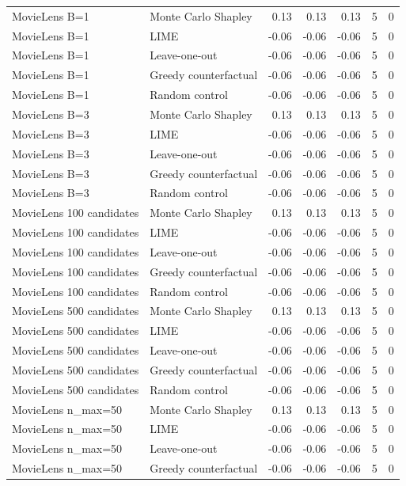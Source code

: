 \begin{table}[t]
{\begin{tabular}{llrrrrr}
MovieLens B=1 & Monte Carlo Shapley & 0.13 & 0.13 & 0.13 & 5 & 0 \\
MovieLens B=1 & LIME & -0.06 & -0.06 & -0.06 & 5 & 0 \\
MovieLens B=1 & Leave-one-out & -0.06 & -0.06 & -0.06 & 5 & 0 \\
MovieLens B=1 & Greedy counterfactual & -0.06 & -0.06 & -0.06 & 5 & 0 \\
MovieLens B=1 & Random control & -0.06 & -0.06 & -0.06 & 5 & 0 \\
MovieLens B=3 & Monte Carlo Shapley & 0.13 & 0.13 & 0.13 & 5 & 0 \\
MovieLens B=3 & LIME & -0.06 & -0.06 & -0.06 & 5 & 0 \\
MovieLens B=3 & Leave-one-out & -0.06 & -0.06 & -0.06 & 5 & 0 \\
MovieLens B=3 & Greedy counterfactual & -0.06 & -0.06 & -0.06 & 5 & 0 \\
MovieLens B=3 & Random control & -0.06 & -0.06 & -0.06 & 5 & 0 \\
MovieLens 100 candidates & Monte Carlo Shapley & 0.13 & 0.13 & 0.13 & 5 & 0 \\
MovieLens 100 candidates & LIME & -0.06 & -0.06 & -0.06 & 5 & 0 \\
MovieLens 100 candidates & Leave-one-out & -0.06 & -0.06 & -0.06 & 5 & 0 \\
MovieLens 100 candidates & Greedy counterfactual & -0.06 & -0.06 & -0.06 & 5 & 0 \\
MovieLens 100 candidates & Random control & -0.06 & -0.06 & -0.06 & 5 & 0 \\
MovieLens 500 candidates & Monte Carlo Shapley & 0.13 & 0.13 & 0.13 & 5 & 0 \\
MovieLens 500 candidates & LIME & -0.06 & -0.06 & -0.06 & 5 & 0 \\
MovieLens 500 candidates & Leave-one-out & -0.06 & -0.06 & -0.06 & 5 & 0 \\
MovieLens 500 candidates & Greedy counterfactual & -0.06 & -0.06 & -0.06 & 5 & 0 \\
MovieLens 500 candidates & Random control & -0.06 & -0.06 & -0.06 & 5 & 0 \\
MovieLens n\_max=50 & Monte Carlo Shapley & 0.13 & 0.13 & 0.13 & 5 & 0 \\
MovieLens n\_max=50 & LIME & -0.06 & -0.06 & -0.06 & 5 & 0 \\
MovieLens n\_max=50 & Leave-one-out & -0.06 & -0.06 & -0.06 & 5 & 0 \\
MovieLens n\_max=50 & Greedy counterfactual & -0.06 & -0.06 & -0.06 & 5 & 0 \\

\end{tabular}}
\end{table}
